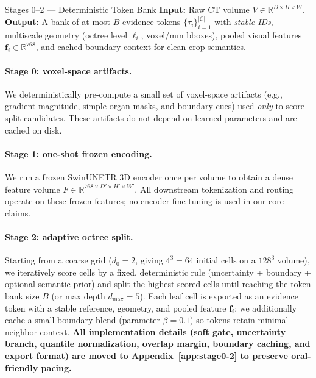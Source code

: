 \documentclass[11pt,a4paper]{article}
\newcommand{\RR}{\mathbb{R}}
\begin{document}
\begin{stagebox}{Stages 0--2 --- Deterministic Token Bank}
\textcolor{inputcolor}{\textbf{Input:}} Raw CT volume $V \in \RR^{D\times H\times W}$.\\
\textcolor{outputcolor}{\textbf{Output:}} A bank of at most $B$ evidence tokens $\{\tau_i\}_{i=1}^{|\mathcal{C}|}$ with \emph{stable IDs}, multiscale geometry (octree level $\ell_i$, voxel/mm bboxes), pooled visual features $\mathbf{f}_i \in \RR^{768}$, and cached boundary context for clean crop semantics.
\end{stagebox}

\paragraph{Stage 0: voxel-space artifacts.}
We deterministically pre-compute a small set of voxel-space artifacts (e.g., gradient magnitude, simple organ masks, and boundary cues) used \emph{only} to score split candidates.
These artifacts do not depend on learned parameters and are cached on disk.

\paragraph{Stage 1: one-shot frozen encoding.}
We run a frozen SwinUNETR 3D encoder once per volume to obtain a dense feature volume $F \in \RR^{768 \times D' \times H' \times W'}$.
All downstream tokenization and routing operate on these frozen features; no encoder fine-tuning is used in our core claims.

\paragraph{Stage 2: adaptive octree split.}
Starting from a coarse grid ($d_0{=}2$, giving $4^3{=}64$ initial cells on a $128^3$ volume), we iteratively score cells by a fixed, deterministic rule (uncertainty + boundary + optional semantic prior) and split the highest-scored cells until reaching the token bank size $B$ (or max depth $d_{\max}{=}5$).
Each leaf cell is exported as an evidence token with a stable reference, geometry, and pooled feature $\mathbf{f}_i$; we additionally cache a small boundary blend (parameter $\beta{=}0.1$) so tokens retain minimal neighbor context.
\textbf{All implementation details (soft gate, uncertainty branch, quantile normalization, overlap margin, boundary caching, and export format) are moved to Appendix~\ref{app:stage0-2} to preserve oral-friendly pacing.}
\end{document}
